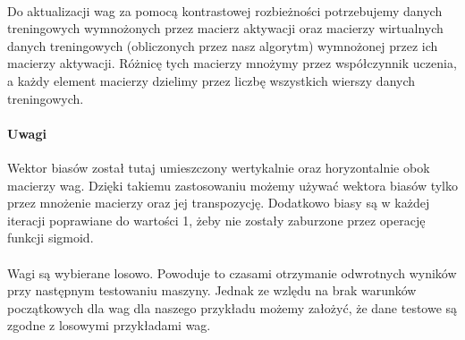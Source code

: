     \paragraph{}
	 Do aktualizacji wag za pomocą kontrastowej rozbieżności potrzebujemy danych treningowych wymnożonych przez macierz aktywacji
	 oraz macierzy wirtualnych danych treningowych (obliczonych przez nasz algorytm) wymnożonej przez ich macierzy aktywacji.
	 Różnicę tych macierzy mnożymy przez współczynnik uczenia, a każdy element macierzy dzielimy przez liczbę wszystkich wierszy danych treningowych.

    \paragraph{Uwagi}
	 Wektor biasów został tutaj umieszczony wertykalnie oraz horyzontalnie obok macierzy wag.
	 Dzięki takiemu zastosowaniu możemy używać wektora biasów tylko przez mnożenie macierzy oraz jej transpozycję.
	 Dodatkowo biasy są w każdej iteracji poprawiane do wartości 1, żeby nie zostały zaburzone przez operację funkcji sigmoid.

    \paragraph{}
	 Wagi są wybierane losowo. Powoduje to czasami otrzymanie odwrotnych wyników przy następnym testowaniu maszyny.
	 Jednak ze wzlędu na brak warunków początkowych dla wag dla naszego przykładu możemy założyć, że dane testowe są zgodne z losowymi przykładami wag.
